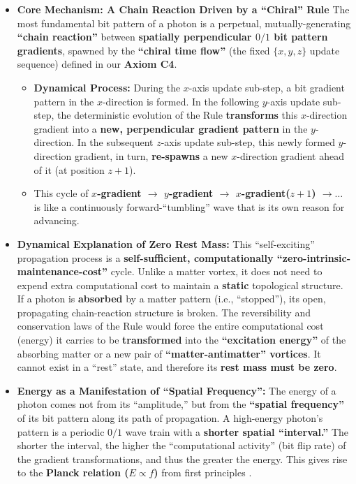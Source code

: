 \documentclass[11pt, a4paper]{article}
\begin{document}
\begin{itemize}
    \item \textbf{Core Mechanism: A Chain Reaction Driven by a ``Chiral'' Rule}
    The most fundamental bit pattern of a photon is a perpetual, mutually-generating \textbf{``chain reaction''} between \textbf{spatially perpendicular $0/1$ bit pattern gradients}, spawned by the \textbf{``chiral time flow''} (the fixed $\{x, y, z\}$ update sequence) defined in our \textbf{Axiom C4}.
    \begin{itemize}
        \item \textbf{Dynamical Process:} During the $x$-axis update sub-step, a bit gradient pattern in the $x$-direction is formed. In the following $y$-axis update sub-step, the deterministic evolution of the Rule \textbf{transforms} this $x$-direction gradient into a \textbf{new, perpendicular gradient pattern} in the $y$-direction. In the subsequent $z$-axis update sub-step, this newly formed $y$-direction gradient, in turn, \textbf{re-spawns} a new $x$-direction gradient ahead of it (at position $z+1$).
        \item This cycle of \textbf{$x$-gradient $\rightarrow$ $y$-gradient $\rightarrow$ $x$-gradient($z+1$) $\rightarrow \dots$} is like a continuously forward-``tumbling'' wave that is its own reason for advancing.
    \end{itemize}

    \item \textbf{Dynamical Explanation of Zero Rest Mass:}
    This ``self-exciting'' propagation process is a \textbf{self-sufficient, computationally ``zero-intrinsic-maintenance-cost''} cycle. Unlike a matter vortex, it does not need to expend extra computational cost to maintain a \textbf{static} topological structure. If a photon is \textbf{absorbed} by a matter pattern (i.e., ``stopped''), its open, propagating chain-reaction structure is broken. The reversibility and conservation laws of the Rule would force the entire computational cost (energy) it carries to be \textbf{transformed} into the \textbf{``excitation energy''} of the absorbing matter or a new pair of \textbf{``matter-antimatter'' vortices}. It cannot exist in a ``rest'' state, and therefore its \textbf{rest mass must be zero}.

    \item \textbf{Energy as a Manifestation of ``Spatial Frequency'':}
    The energy of a photon comes not from its ``amplitude,'' but from the \textbf{``spatial frequency''} of its bit pattern along its path of propagation. A high-energy photon's pattern is a periodic $0/1$ wave train with a \textbf{shorter spatial ``interval.''} The shorter the interval, the higher the ``computational activity'' (bit flip rate) of the gradient transformations, and thus the greater the energy. This gives rise to the \textbf{Planck relation ($E \propto f$)} from first principles \cite{deBroglie1930}.


\end{itemize}
\end{document}
